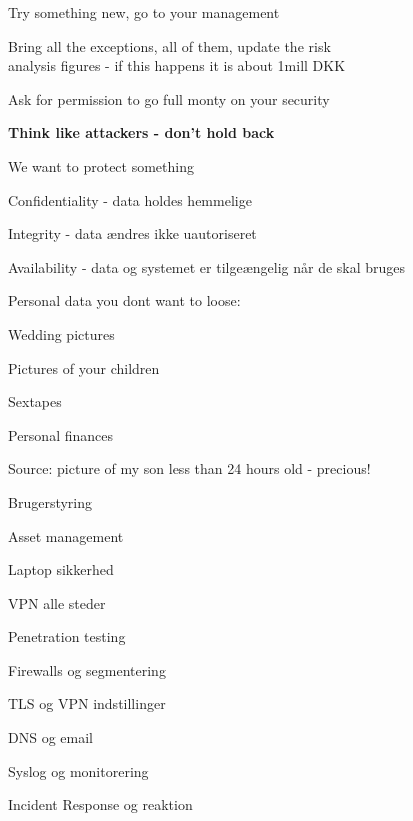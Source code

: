 \documentclass[Screen16to9,17pt]{foils}
\begin{document}
Try something new, go to your management

Bring all the exceptions, all of them, update the risk \\
analysis figures - if this happens it is about 1mill DKK

Ask for permission to go full monty on your security

{\bf Think like attackers - don't hold back}




\begin{list1}
\item We want to protect something
\item Confidentiality - data holdes hemmelige
\item Integrity - data ændres ikke uautoriseret
\item Availability - data og systemet er tilgeængelig når de skal bruges
\end{list1}


\begin{list1}
\item Personal data you dont want to loose:
\begin{list2}
\item Wedding pictures
\item Pictures of your children
\item Sextapes
\item Personal finances
\end{list2}
\end{list1}

Source: picture of my son less than 24 hours old - precious!





\begin{list2}
\item Brugerstyring
\item Asset management
\item Laptop sikkerhed
\item VPN alle steder
\item Penetration testing
\item Firewalls og segmentering
\item TLS og VPN indstillinger
\item DNS og email
\item Syslog og monitorering
\item Incident Response og reaktion
\end{list2}
\end{document}
